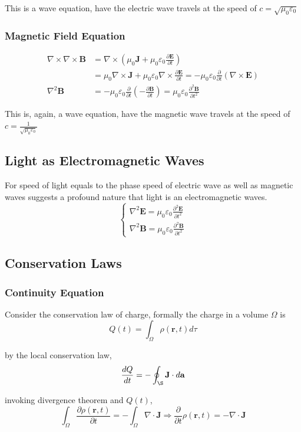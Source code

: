 \documentclass[openany]{book}
\begin{document}
This is a wave equation, have the electric wave travels at the speed of $c=\sqrt{\mu_0\varepsilon_0}$
\subsubsection{Magnetic Field Equation}
\begin{align*}
\nabla \times \nabla \times \mathbf{B}&=\nabla \times \left(\mu_0 \mathbf{J} + \mu_0\varepsilon_0\frac{\partial \mathbf{E}}{\partial t}\right)\\
&=\mu_0 \nabla \times \mathbf{J}+\mu_0\varepsilon_0 \nabla \times \frac{\partial \mathbf{E}}{\partial t}=-\mu_0\varepsilon_0 \frac{\partial }{\partial t}\left(\nabla \times \mathbf{E}\right)\\
\nabla ^2\mathbf{B}&=-\mu_0\varepsilon_0 \frac{\partial }{\partial t}\left(-\frac{\partial \mathbf{B}}{\partial t}\right)=\mu_0\varepsilon_0 \frac{\partial ^2\mathbf{B}}{\partial t^2}
\end{align*}

This is, again, a wave equation, have the magnetic wave travels at the speed of $c=\frac{1}{\sqrt{\mu_0\varepsilon_0 }}$
\subsection{Light as Electromagnetic Waves}
For speed of light equals to the phase speed of electric wave as well as magnetic waves suggests a profound nature that light is an electromagnetic waves. 
\[\begin{cases}
\nabla ^2\mathbf{E}=\mu_0 \varepsilon_0\frac{\partial ^2 \mathbf{E}}{\partial t^2}\\
\nabla ^2\mathbf{B}=\mu_0\varepsilon_0 \frac{\partial ^2\mathbf{B}}{\partial t^2}
\end{cases}\]
\subsection{Conservation Laws}
\subsubsection{Continuity Equation}
Consider the conservation law of charge, formally the charge in a volume $\Omega $ is 
\[Q(t)=\int _{\Omega }\rho (\mathbf{r},t)d\tau\]

by the local conservation law,
\[\frac{dQ}{dt}=-\oint _{\S}\mathbf{J}\cdot d\mathbf{a}\]

invoking divergence theorem and $Q(t)$,
\[\int _{\Omega }\frac{\partial \rho (\mathbf{r},t)}{\partial t}=-\int _{\Omega }\nabla \cdot \mathbf{J}\Rightarrow \frac{\partial }{\partial t}\rho (\mathbf{r},t)=-\nabla \cdot \mathbf{J}\]
\end{document}
